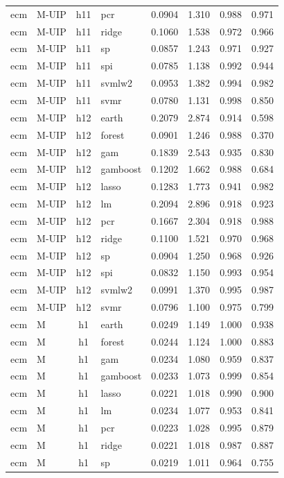 \begin{ThreePartTable}
\begin{longtable}[t]{llclcccc}
ecm & M-UIP & h11 & pcr & 0.0904 & 1.310 & 0.988 & 0.971\\
ecm & M-UIP & h11 & ridge & 0.1060 & 1.538 & 0.972 & 0.966\\
ecm & M-UIP & h11 & sp & 0.0857 & 1.243 & 0.971 & 0.927\\
ecm & M-UIP & h11 & spi & 0.0785 & 1.138 & 0.992 & 0.944\\
ecm & M-UIP & h11 & svmlw2 & 0.0953 & 1.382 & 0.994 & 0.982\\
ecm & M-UIP & h11 & svmr & 0.0780 & 1.131 & 0.998 & 0.850\\
\addlinespace
ecm & M-UIP & h12 & earth & 0.2079 & 2.874 & 0.914 & 0.598\\
ecm & M-UIP & h12 & forest & 0.0901 & 1.246 & 0.988 & 0.370\\
ecm & M-UIP & h12 & gam & 0.1839 & 2.543 & 0.935 & 0.830\\
ecm & M-UIP & h12 & gamboost & 0.1202 & 1.662 & 0.988 & 0.684\\
ecm & M-UIP & h12 & lasso & 0.1283 & 1.773 & 0.941 & 0.982\\
ecm & M-UIP & h12 & lm & 0.2094 & 2.896 & 0.918 & 0.923\\
ecm & M-UIP & h12 & pcr & 0.1667 & 2.304 & 0.918 & 0.988\\
ecm & M-UIP & h12 & ridge & 0.1100 & 1.521 & 0.970 & 0.968\\
ecm & M-UIP & h12 & sp & 0.0904 & 1.250 & 0.968 & 0.926\\
ecm & M-UIP & h12 & spi & 0.0832 & 1.150 & 0.993 & 0.954\\
ecm & M-UIP & h12 & svmlw2 & 0.0991 & 1.370 & 0.995 & 0.987\\
ecm & M-UIP & h12 & svmr & 0.0796 & 1.100 & 0.975 & 0.799\\
\addlinespace
ecm & M & h1 & earth & 0.0249 & 1.149 & 1.000 & 0.938\\
ecm & M & h1 & forest & 0.0244 & 1.124 & 1.000 & 0.883\\
ecm & M & h1 & gam & 0.0234 & 1.080 & 0.959 & 0.837\\
ecm & M & h1 & gamboost & 0.0233 & 1.073 & 0.999 & 0.854\\
ecm & M & h1 & lasso & 0.0221 & 1.018 & 0.990 & 0.900\\
ecm & M & h1 & lm & 0.0234 & 1.077 & 0.953 & 0.841\\
ecm & M & h1 & pcr & 0.0223 & 1.028 & 0.995 & 0.879\\
ecm & M & h1 & ridge & 0.0221 & 1.018 & 0.987 & 0.887\\
ecm & M & h1 & sp & 0.0219 & 1.011 & 0.964 & 0.755\\

\end{longtable}
\end{ThreePartTable}
